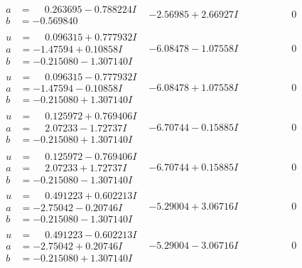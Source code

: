 \documentclass[1p]{elsarticle_modified}
\theoremstyle{definition}
\begin{document}
$$\begin{array}{c|c|c}
\begin{aligned}
a &= \phantom{-}0.263695 - 0.788224 I \\
b &= -0.569840\phantom{ +0.000000I}\end{aligned}
 & -2.56985 + 2.66927 I & \phantom{-0.000000 } 0 \\ \hline\begin{aligned}
u &= \phantom{-}0.096315 + 0.777932 I \\
a &= -1.47594 + 0.10858 I \\
b &= -0.215080 - 1.307140 I\end{aligned}
 & -6.08478 - 1.07558 I & \phantom{-0.000000 } 0 \\ \hline\begin{aligned}
u &= \phantom{-}0.096315 - 0.777932 I \\
a &= -1.47594 - 0.10858 I \\
b &= -0.215080 + 1.307140 I\end{aligned}
 & -6.08478 + 1.07558 I & \phantom{-0.000000 } 0 \\ \hline\begin{aligned}
u &= \phantom{-}0.125972 + 0.769406 I \\
a &= \phantom{-}2.07233 - 1.72737 I \\
b &= -0.215080 + 1.307140 I\end{aligned}
 & -6.70744 - 0.15885 I & \phantom{-0.000000 } 0 \\ \hline\begin{aligned}
u &= \phantom{-}0.125972 - 0.769406 I \\
a &= \phantom{-}2.07233 + 1.72737 I \\
b &= -0.215080 - 1.307140 I\end{aligned}
 & -6.70744 + 0.15885 I & \phantom{-0.000000 } 0 \\ \hline\begin{aligned}
u &= \phantom{-}0.491223 + 0.602213 I \\
a &= -2.75042 - 0.20746 I \\
b &= -0.215080 - 1.307140 I\end{aligned}
 & -5.29004 + 3.06716 I & \phantom{-0.000000 } 0 \\ \hline\begin{aligned}
u &= \phantom{-}0.491223 - 0.602213 I \\
a &= -2.75042 + 0.20746 I \\
b &= -0.215080 + 1.307140 I\end{aligned}
 & -5.29004 - 3.06716 I & \phantom{-0.000000 } 0 \\ \hline\begin{aligned}

\end{aligned}
\end{array}$$
\end{document}
